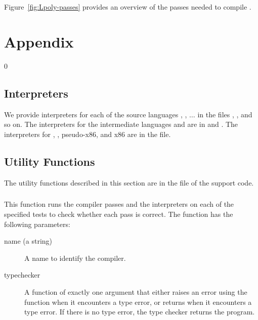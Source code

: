 \documentclass[7x10]{TimesAPriori_MIT}%
\def\racketEd{0}
\providecommand{\BookEdition}{1}
\let\edition\BookEdition
\numberwithin{theorem}{chapter}
\numberwithin{definition}{chapter}
\numberwithin{equation}{chapter}
\begin{document}
Figure~\ref{fig:Lpoly-passes} provides an overview of the passes
needed to compile \LangPoly{}.



\clearpage

\appendix

\chapter{Appendix}
\setcounter{footnote}{0}

{\if\edition\racketEd

\section{Interpreters}
\label{appendix:interp}

We provide interpreters for each of the source languages \LangInt{},
\LangVar{}, $\ldots$ in the files ,
, and so on.  The interpreters for the
intermediate languages \LangCVar{} and \LangCIf{} are in
 and .  The interpreters for
\LangCVec{}, \LangCFun{}, pseudo-x86, and x86 are in the
 file.

\section{Utility Functions}
\label{appendix:utilities}

The utility functions described in this section are in the
 file of the support code.

\paragraph{}

This function runs the compiler passes and the interpreters on each of
the specified tests to check whether each pass is correct. The
 function has the following parameters:
\begin{description}
\item[name (a string)] A name to identify the compiler.
\item[typechecker] A function of exactly one argument that either
  raises an error using the  function when it encounters a
  type error, or returns  when it encounters a type
  error. If there is no type error, the type checker returns the
  program.


\end{description}}
\end{document}
